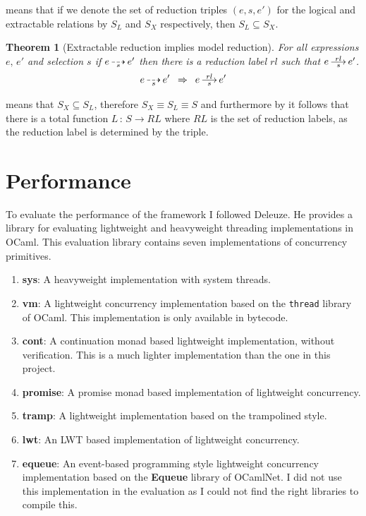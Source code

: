 \documentclass[12pt,twoside,notitlepage]{report}
\newcommand{\red}[2]{\stackon[.05ex]{\stackunder[-0.05ex]{$\longrightarrow$}{$\scriptstyle #1$}}{$\scriptstyle #2$}}
\newcommand{\xred}[1]{\stackunder[-0.05ex]{$\dashrightarrow$}{$\scriptstyle #1$}}
\theoremstyle{plain}%
\newtheorem{thm}{Theorem}[section]
\theoremstyle{definition}
\theoremstyle{remark}
\begin{document}
 means that if we denote the set of reduction triples $ (e,s,e') $ for the logical and extractable relations by $ S_L $ and $ S_X $ respectively, then $ S_L \subseteq S_X $.

\begin{thm}[Extractable reduction implies model reduction]
\label{thm:xjo_to_jo}
For all expressions $ e,\,e' $ and selection $ s $ if $ e\, \xred{s}\, e' $ then there is a reduction label $ rl $ such that $ e\, \red{s}{rl}\, e' $.
\[ e\, \xred{s}\, e' \,\,\,\Rightarrow \,\,\,  e\, \red{s}{rl}\, e' \]
\end{thm}

 means that $ S_X \subseteq S_L $, therefore $ S_X \equiv S_L \equiv S $ and furthermore by  it follows that there is a total function $ L\,:\, S \rightarrow RL $ where $ RL $ is the set of reduction labels, as the reduction label is determined by the triple.

\section{Performance}
\label{sec:performance_eval}
To evaluate the performance of the framework I followed Deleuze\cite{deleuzelight}. He provides a library for evaluating lightweight and heavyweight threading implementations in OCaml. This evaluation library contains seven implementations of concurrency primitives.
\begin{enumerate}
\item{\textbf{sys}: A heavyweight implementation with system threads.}
\item{\textbf{vm}: A lightweight concurrency implementation based on the \verb|thread| library of OCaml. This implementation is only available in bytecode.}
\item{\textbf{cont}: A continuation monad based lightweight implementation\cite[p.~12-13]{deleuzelight}, without verification. This is a much lighter implementation than the one in this project.}
\item{\textbf{promise}: A promise monad based implementation of lightweight concurrency\cite[p.~13-15]{deleuzelight}.}
\item{\textbf{tramp}: A lightweight implementation based on the trampolined style\cite[p.~11-12]{deleuzelight}.}
\item{\textbf{lwt}: An LWT\cite{LWT} based implementation of lightweight concurrency.}
\item{\textbf{equeue}: An event-based programming style lightweight concurrency implementation\cite[p.~15-18]{deleuzelight} based on the \textbf{Equeue} library of OCamlNet. I did not use this implementation in the evaluation as I could not find the right libraries to compile this.}
\end{enumerate}
\end{document}
